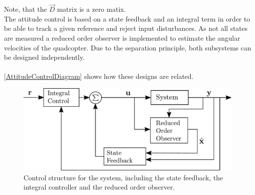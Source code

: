 \noindent Note, that the $\vec{D}$ matrix is a zero matix.\\
\indent The attitude control is based on a state feedback and an integral term in order to be able to track a given reference and reject input disturbances. As not all states are measured a reduced order observer is implemented to estimate the angular velocities of the quadcopter. Due to the separation principle, both subsystems can be designed independently. \cite{ssReference}
\\
\\
\noindent\autoref{AttitudeControlDiagram} shows how these designs are related.
\begin{figure}[H]
    \centering
    \includegraphics[width=.4\textwidth]{figures/AttitudeControlDiagram}
    \caption{ Control structure for the system, including the state feedback, the integral controller and the reduced order observer.}
    \label{AttitudeControlDiagram}
\end{figure}

